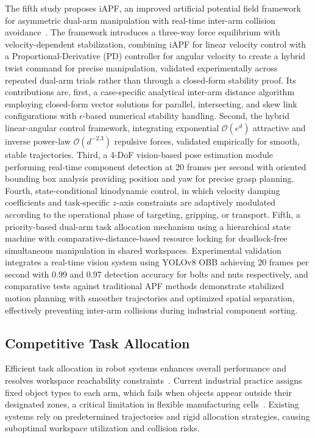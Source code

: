 The fifth study proposes iAPF, an improved artificial potential field framework for asymmetric
dual-arm manipulation with real-time inter-arm collision avoidance~\citep{surya2025iapf}. The framework
introduces a three-way force equilibrium with velocity-dependent stabilization, combining iAPF for
linear velocity control with a Proportional-Derivative (PD) controller for angular velocity to
create a hybrid twist command for precise manipulation, validated experimentally across repeated
dual-arm trials rather than through a closed-form stability proof. Its contributions are, first, a
case-specific analytical inter-arm distance algorithm employing closed-form vector solutions for
parallel, intersecting, and skew link configurations with $\epsilon$-based numerical stability
handling. Second, the hybrid linear-angular control framework, integrating exponential
$\mathcal{O}(e^{d})$ attractive and inverse power-law $\mathcal{O}(d^{-2.3})$ repulsive forces,
validated empirically for smooth, stable trajectories. Third, a 4-DoF vision-based pose
estimation module performing real-time component detection at 20 frames per second with oriented
bounding box analysis providing position and yaw for precise grasp planning. Fourth, state-conditional
kinodynamic control, in which velocity damping coefficients and task-specific $z$-axis constraints
are adaptively modulated according to the operational phase of targeting, gripping, or transport.
Fifth, a priority-based dual-arm task allocation mechanism using a hierarchical state machine with
comparative-distance-based resource locking for deadlock-free simultaneous manipulation in shared
workspaces. Experimental validation integrates a real-time vision system using YOLOv8 OBB achieving
20 frames per second with 0.99 and 0.97 detection accuracy for bolts and nuts respectively, and
comparative tests against traditional APF methods demonstrate stabilized motion planning with
smoother trajectories and optimized spatial separation, effectively preventing inter-arm collisions
during industrial component sorting.

\subsection{Competitive Task Allocation}\label{subsec:intro_allocation}

Efficient task allocation in robot systems enhances overall performance and resolves workspace
reachability constraints~\citep{khamis2015multi,keshvarparast2024collaborative,patra2024online}.
Current industrial practice assigns fixed object types to each arm, which fails when objects appear
outside their designated zones, a critical limitation in flexible manufacturing
cells~\citep{pedersen2016robot}. Existing systems rely on predetermined trajectories and rigid
allocation strategies, causing suboptimal workspace utilization and collision risks.

